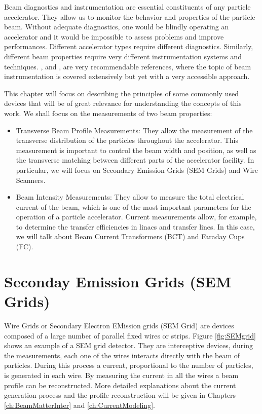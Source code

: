 \pagestyle{fancy}

\graphicspath{ {Figures/Chapter2_BeamInstrumentation/} }

Beam diagnostics and instrumentation are essential constituents of any particle accelerator. They allow us to monitor the behavior and properties of the particle beam. Without adequate diagnostics, one would be blindly operating an accelerator and it would be impossible to assess problems and improve performances. Different accelerator types require different diagnostics. Similarly, different beam properties require very different instrumentation systems and techniques.  \parencite*[][]{ref:BeamInstrumentationBook}, \parencite*[][]{ref:NotesBeamInst} and \parencite*[][]{ref:CASbeamInst}, are very recommendable references, where the topic of beam instrumentation is covered extensively but yet with a very accessible approach. 

This chapter will focus on describing the principles of some commonly used devices that will be of great relevance for understanding the concepts of this work. We shall focus on the measurements of two beam properties: 

\begin{itemize}
    \item Transverse Beam Profile Measurements: They allow the measurement of the transverse distribution of the particles throughout the accelerator. This measurement is important to control the beam width and position, as well as the transverse matching between different parts of the accelerator facility. In particular, we will focus on Secondary Emission Grids (SEM Grids) and Wire Scanners. 
    \item Beam Intensity Measurements: They allow to measure the total electrical current of the beam, which is one of the most important parameters for the operation of a particle accelerator. Current measurements allow, for example, to determine the transfer efficiencies in linacs and transfer lines. In this case, we will talk about Beam Current Transformers (BCT) and Faraday Cups (FC).
\end{itemize}

\section{Seconday Emission Grids (SEM Grids)}
\label{sec:SEMgrids}

Wire Grids or Secondary Electron EMission grids (SEM Grid) are devices composed of a large number of parallel fixed wires or strips. Figure \ref{fig:SEMgrid} shows an example of a SEM grid detector. They are interceptive devices, during the measurements, each one of the wires interacts directly with the beam of particles. During this process a current, proportional to the number of particles, is generated in each wire.  By measuring the current in all the wires a beam profile can be reconstructed. More detailed explanations about the current generation process and the profile reconstruction will be given in Chapters \ref{ch:BeamMatterInter} and \ref{ch:CurrentModeling}.

